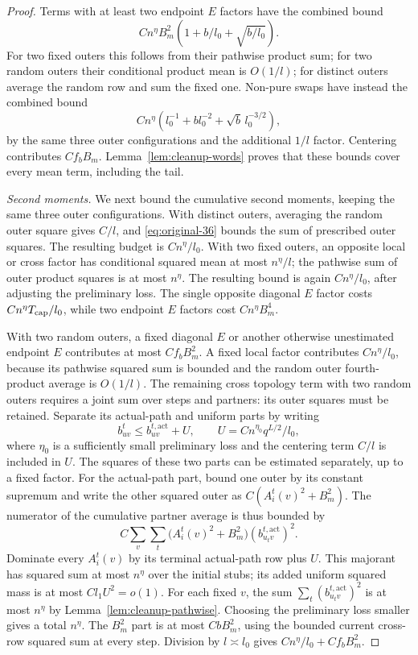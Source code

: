 \begin{proof}
Terms with at least two endpoint $E$ factors have the combined
bound
\[
 Cn^\eta B_m^2
                  \left(1+b/l_0+\sqrt{b/l_0}\right).
\]
For two fixed outers this follows from their pathwise product
sum; for two random outers their conditional product mean
is $O(1/l)$; for distinct outers average the random row and
sum the fixed one.  Non-pure swaps have instead the combined
bound
\[
 Cn^\eta\left(l_0^{-1}+bl_0^{-2}
                              +\sqrt b\,l_0^{-3/2}\right),
\]
by the same three outer configurations and the additional
$1/l$ factor.  Centering contributes $Cf_bB_m$.
Lemma~\ref{lem:cleanup-words} proves that these bounds cover
every mean term, including the tail.

\emph{Second moments.}
We next bound the cumulative second moments, keeping the same
three outer configurations.  With distinct outers, averaging the random
outer square gives $C/l$,
and \eqref{eq:original-36} bounds the sum of prescribed
outer squares.  The resulting budget is $Cn^\eta/l_0$.
With two fixed outers, an opposite local or cross factor
has conditional squared mean at most $n^\eta/l$; the
pathwise sum of outer product squares is at most $n^\eta$.
The resulting bound is again $Cn^\eta/l_0$, after adjusting
the preliminary loss.  The single opposite diagonal $E$
factor costs $Cn^\eta T_{\rm cap}/l_0$, while two endpoint
$E$ factors cost $Cn^\eta B_m^4$.

With two random outers, a fixed diagonal $E$ or another
otherwise unestimated endpoint $E$ contributes at most
$Cf_bB_m^2$.  A fixed local factor contributes
$Cn^\eta/l_0$, because its pathwise squared sum is bounded
and the random outer fourth-product average is $O(1/l)$.
The remaining cross topology term with two random outers requires
a joint sum over steps and partners: its outer squares must be
retained.  Separate its actual-path and uniform parts by writing
\[
 b_{uv}^t\leq b_{uv}^{t,\mathrm{act}}+U,
 \qquad U=Cn^{\eta_0}q^{L/2}/l_0,
\]
where $\eta_0$ is a sufficiently small preliminary loss and the
centering term $C/l$ is included in $U$.  The squares of these
two parts can be estimated separately, up to a fixed factor.
For the actual-path part, bound one outer by its constant supremum and
write the other squared outer as
$C(A_i^t(v)^2+B_m^2)$.  The numerator of the cumulative
partner average is thus bounded by
\[
 C\sum_v\sum_t
        \bigl(A_i^t(v)^2+B_m^2\bigr)
                         (b_{u_t v}^{t,\mathrm{act}})^2.
\]
Dominate every $A_i^t(v)$ by its terminal actual-path row plus
$U$.  This majorant has squared sum at most $n^\eta$ over the
initial stubs; its added uniform squared mass is at most
$Cl_1U^2=o(1)$.  For each fixed $v$, the sum
$\sum_t(b_{u_t v}^{t,\mathrm{act}})^2$ is at most $n^\eta$ by
Lemma~\ref{lem:cleanup-pathwise}.  Choosing the preliminary
loss smaller gives a total $n^\eta$.  The $B_m^2$ part is
at most $CbB_m^2$, using the bounded current cross-row
squared sum at every step.  Division by $l\asymp l_0$
gives $Cn^\eta/l_0+Cf_bB_m^2$.


\end{proof}
